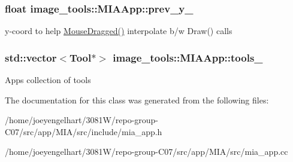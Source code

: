 \subsubsection[{\texorpdfstring{prev\+\_\+y\+\_\+}{prev_y_}}]{\setlength{\rightskip}{0pt plus 5cm}float image\+\_\+tools\+::\+M\+I\+A\+App\+::prev\+\_\+y\+\_\+\hspace{0.3cm}{\ttfamily [private]}}\hypertarget{classimage__tools_1_1MIAApp_a0917b83acda7569809c346ae6e33ad15}{}\label{classimage__tools_1_1MIAApp_a0917b83acda7569809c346ae6e33ad15}
y-\/coord to help \hyperlink{classimage__tools_1_1MIAApp_a22de582c71210c873cde634130478158}{Mouse\+Dragged()} interpolate b/w Draw() calls 
\subsubsection[{\texorpdfstring{tools\+\_\+}{tools_}}]{\setlength{\rightskip}{0pt plus 5cm}std\+::vector$<${\bf Tool}$\ast$$>$ image\+\_\+tools\+::\+M\+I\+A\+App\+::tools\+\_\+\hspace{0.3cm}{\ttfamily [private]}}\hypertarget{classimage__tools_1_1MIAApp_a89c184b959b2c88cd80facd6aa74e2a5}{}\label{classimage__tools_1_1MIAApp_a89c184b959b2c88cd80facd6aa74e2a5}
App\textquotesingle{}s collection of tools 

The documentation for this class was generated from the following files\+:\begin{DoxyCompactItemize}
\item 
/home/joeyengelhart/3081\+W/repo-\/group-\/\+C07/src/app/\+M\+I\+A/src/include/mia\+\_\+app.\+h\item 
/home/joeyengelhart/3081\+W/repo-\/group-\/\+C07/src/app/\+M\+I\+A/src/mia\+\_\+app.\+cc\end{DoxyCompactItemize}
